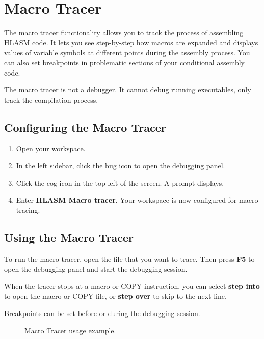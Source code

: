 \chapter{Macro Tracer}
The macro tracer functionality allows you to track the process of assembling HLASM code. It lets you see step-by-step how macros are expanded and displays values of variable symbols at different points during the assembly process. You can also set breakpoints in problematic sections of your conditional assembly code. 

The macro tracer is not a debugger. It cannot debug running executables, only track the compilation process.

\section{Configuring the Macro Tracer}

\begin{enumerate}
	\item Open your workspace.
	\item In the left sidebar, click the bug icon to open the debugging panel.
	\item Click the cog icon in the top left of the screen. A  prompt displays.
	\item Enter \textbf{HLASM Macro tracer}. Your workspace is now configured for macro tracing.
\end{enumerate}

\section{Using the Macro Tracer}

To run the macro tracer, open the file that you want to trace. Then press \textbf{F5} to open the debugging panel and start the debugging session.

When the tracer stops at a macro or COPY instruction, you can select \textbf{step into} to open the macro or COPY file, or \textbf{step over} to skip to the next line.

Breakpoints can be set before or during the debugging session.

\begin{figure}[H]
	\centering
	\caption{\href{https://github.com/eclipse/che-che4z-lsp-for-hlasm/blob/master/readme\_res/tracer.gif}{Macro Tracer usage example.}}
\end{figure}